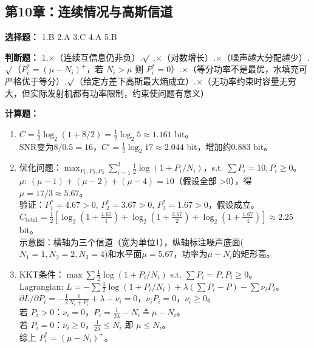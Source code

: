 \documentclass[12pt,a4paper]{ctexart}
\begin{document}
\subsection*{第10章：连续情况与高斯信道}

\textbf{选择题：} 1.B \quad 2.A \quad 3.C \quad 4.A \quad 5.B

\textbf{判断题：} 1.$\times$（连续互信息仍非负）.$\surd$ .$\times$（对数增长）.$\times$（噪声越大分配越少）.$\surd$（$P_i^* = (\mu-N_i)^+$，若 $N_i>\mu$ 则 $P_i^*=0$）.$\times$（等分功率不是最优，水填充可严格优于等分）.$\surd$（给定方差下高斯最大熵成立）.$\times$（无功率约束时容量无穷大，但实际发射机都有功率限制，约束使问题有意义）

\textbf{计算题：}
\begin{enumerate}[leftmargin=*]

\item[(1)] $C=\frac{1}{2}\log_2(1+8/2)=\frac{1}{2}\log_2 5\approx1.161$ bit。\\
SNR变为$8/0.5=16$，$C'=\frac{1}{2}\log_2 17\approx2.044$ bit，增加约0.883 bit。

\item[(2)] 优化问题：$\max_{P_1,P_2,P_3} \sum_{i=1}^3 \frac{1}{2}\log(1+P_i/N_i)$，s.t. $\sum P_i=10, P_i\geq0$。\\
$\mu$: $(\mu-1)+(\mu-2)+(\mu-4)=10$（假设全部 >0），得$\mu=17/3\approx5.67$。\\
验证：$P_1^*=4.67>0$, $P_2^*=3.67>0$, $P_3^*=1.67>0$，假设成立。\\
$C_{\text{total}}=\frac12[\log_2(1+\frac{4.67}{1})+\log_2(1+\frac{3.67}{2})+\log_2(1+\frac{1.67}{4})]\approx2.25$ bit。\\
示意图：横轴为三个信道（宽为单位1），纵轴标注噪声底面($N_1=1,N_2=2,N_3=4$)和水平面$\mu=5.67$，功率为$\mu-N_i$的矩形高。

\item[(3)] KKT条件：$\max \sum\frac12\log(1+P_i/N_i)$ s.t. $\sum P_i=P, P_i\geq0$。\\
Lagrangian: $L=-\sum\frac12\log(1+P_i/N_i)+\lambda(\sum P_i-P)-\sum\nu_i P_i$。\\
$\partial L/\partial P_i = -\frac{1}{2}\frac{1}{N_i+P_i}+\lambda-\nu_i=0$，$\nu_i P_i=0$，$\nu_i\geq0$。\\
若 $P_i>0$：$\nu_i=0$，$P_i = \frac{1}{2\lambda}-N_i \triangleq \mu-N_i$。\\
若 $P_i=0$：$\nu_i\geq0$，$\frac{1}{2\lambda}\leq N_i$ 即 $\mu\leq N_i$。\\
综上 $P_i^*=(\mu-N_i)^+$。


\end{enumerate}
\end{document}
